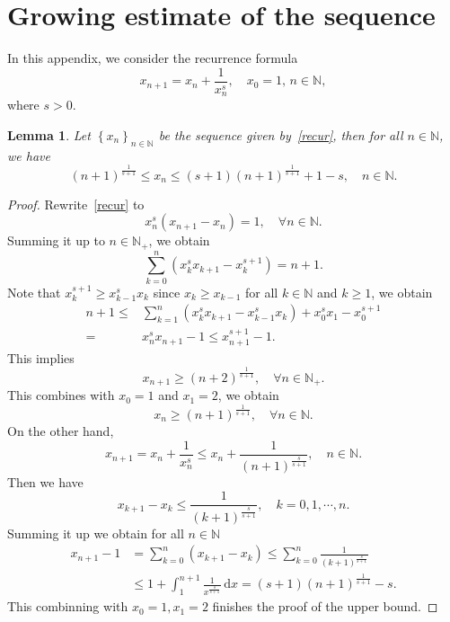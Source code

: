 \documentclass{amsart}
\renewcommand{\d}{\,\mathrm{d}}
\newcommand\N{\ensuremath{\mathbb{N}}}
\newtheorem{lemma}[theorem]{Lemma}
\theoremstyle{definition}
\begin{document}
\section{Growing estimate of the sequence}
In this appendix, we consider the recurrence formula
\begin{equation}
	x_{n+1}=x_n+\frac{1}{x_n^{s}},\quad x_0=1, \,n\in \N,\label{recur}
\end{equation}
where $s>0$. 
\begin{lemma}
	Let $\left\{x_n\right\} _{n\in \N}$ be the sequence given by~\eqref{recur}, then for all $n\in \N$, we have
	\begin{equation}
		(n+1)^{\frac{1}{s+1}}\le x_n\le (s+1)(n+1)^{\frac{1}{s+1}}+1-s, \quad n\in \N.
	\end{equation}
\end{lemma}
\begin{proof}
	Rewrite~\eqref{recur} to
	\begin{equation}
		x_n^{s}(x_{n+1}-x_n)=1,\quad \forall n\in \N.
	\end{equation}
	Summing it up to $n \in \N_{+}$, we obtain
	 \begin{equation}
		\sum_{k=0}^{n} \left( x_{k}^{s}x_{k+1}-x_{k}^{s+1} \right) =n+1.
	\end{equation}
	Note that $x_k^{s+1}\ge x_{k-1}^{s}x_k$ since $x_k\ge x_{k-1}$ for all $k\in \N$ and $k\ge 1$, we obtain
	 \begin{equation}
		\begin{aligned}
			n+1 \le & \sum_{k=1}^{n} \left( x_{k}^{s}x_{k+1}-x_{k-1}^{s}x_k \right) +x^{s}_0x_1-x_0^{s+1}\\
			= & x^{s}_{n}x_{n+1}-1\le x_{n+1}^{s+1}-1.
		\end{aligned} 
	\end{equation}
	This implies
	\begin{equation}
		x_{n+1} \ge (n+2)^{\frac{1}{s+1}},\quad \forall n \in \N_{+}.
	\end{equation}
	This combines with $x_0=1$ and $x_1=2$, we obtain 
	\begin{equation}
		x_{n}\ge \left( n+1 \right) ^{\frac{1}{s+1}},\quad \forall n\in \N.
	\end{equation}
On the other hand,
\begin{equation}
	x_{n+1}=x_n+\frac{1}{x_n^{s}}\le x_n+\frac{1}{(n+1)^{\frac{s}{s+1}}},\quad  n\in \N.
\end{equation}
Then we have
\begin{equation}
	x_{k+1}-x_k\le \frac{1}{(k+1)^{\frac{s}{s+1}}},\quad k=0,1,\cdots ,n.
\end{equation}
Summing it up we obtain for all $n\in \N$
\begin{equation}
	\begin{aligned}
		x_{n+1}-1 &= \sum_{k=0}^{n} (x_{k+1}-x_k)\le \sum_{k=0}^{n} \frac{1}{(k+1)^{\frac{s}{s+1}}}\\
			  &\le 1+\int_1^{n+1} \frac{1}{x^{\frac{s}{s+1}}}\d x=(s+1)(n+1)^{\frac{1}{s+1}}-s.
	\end{aligned} 
\end{equation}
This combinning with $x_0=1,x_1=2$ finishes the proof of the upper bound. 
\end{proof}


\end{document}
